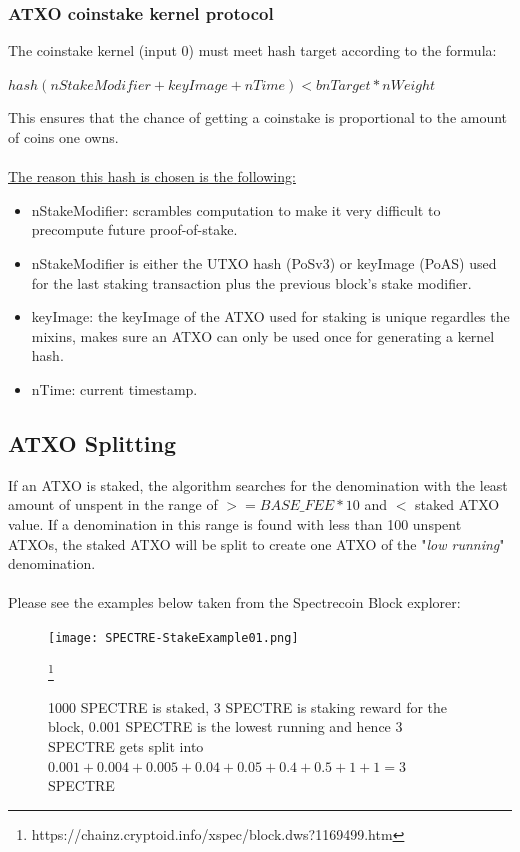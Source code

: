 \subsubsection{ATXO coinstake kernel protocol}
The coinstake kernel (input 0) must meet hash target according to the formula:



\vspace{5mm} %
$ hash(nStakeModifier + keyImage + nTime) < bnTarget * nWeight  $
\vspace{5mm} %

\noindent
This ensures that the chance of getting a coinstake is proportional to
the amount of coins one owns.
\\
\\
\noindent
\underline{The reason this hash is chosen is the following:}
\begin{itemize}
	\item nStakeModifier: scrambles computation to make it very difficult
	to precompute future proof-of-stake.
	\item nStakeModifier is either the UTXO hash (PoSv3) or keyImage (PoAS) 
	used for the last staking transaction plus the previous block's stake 
	modifier.
	\item keyImage: the keyImage of the ATXO used for staking is unique 
	regardles the mixins, makes sure an ATXO can only be used once for 
	generating a kernel hash.
	\item nTime: current timestamp.
\end{itemize}



\subsection{ATXO Splitting}
If an ATXO is staked, the algorithm searches for the denomination with the
least amount of unspent in the range of  $>= BASE\_FEE * 10$ and $<$ staked
ATXO value. If a denomination in this range is found with less than 100
unspent ATXOs, the staked ATXO will be split to create one ATXO of the
"\textit{low running}" denomination.
\\
\\
\noindent
Please see the examples below taken from the Spectrecoin Block explorer:

\begin{figure}[ht]
	
	\centering
	\texttt{[image: SPECTRE-StakeExample01.png]}
	\caption{1000 SPECTRE is staked, 3 SPECTRE is staking reward for the 
	block, 0.001 SPECTRE is the lowest running and hence 3 SPECTRE gets 
	split into $0.001 + 0.004 + 0.005 + 0.04 + 0.05 + 0.4 + 0.5 + 1 + 1 = 3$ SPECTRE}
	\footnote{https://chainz.cryptoid.info/xspec/block.dws?1169499.htm}
\end{figure}




